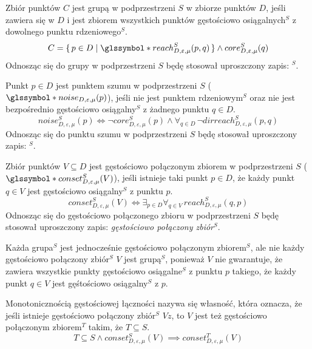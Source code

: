  \newline
Zbiór punktów $ C $ jest grupą w podprzestrzeni $ S $ w zbiorze punktów $ D $, jeśli zawiera się w $ D $ i jest zbiorem wszystkich punktów gęstościowo osiągalnych$^S$ z dowolnego punktu rdzeniowego$^S$. 
\begin{equation}
C = \set{p \in D | \s{reach}^S_{D,\varepsilon,\mu}(p, q)} \land core^S_{D,\varepsilon,\mu}(q)
\end{equation}
Odnosząc się do grupy w podprzestrzeni $ S $ będę stosował uproszczony zapis: \textit{$^S$}.
\smallskip

 \newline
Punkt $ p\in D $ jest punktem szumu w podprzestrzeni $ S $ ($ \s{noise}_{D,\varepsilon,\mu}(p) $), jeśli nie jest punktem rdzeniowym$^S$ oraz nie jest bezpośrednio gęstościowo osiągalny$^S$ z żadnego punktu $q \in D$. 
\begin{equation}
noise^S_{D,\varepsilon,\mu}(p) \iff \neg core^S_{D,\varepsilon,\mu}(p) \land \forall_{q\in D}\,\neg dirreach^S_{D,\varepsilon,\mu}(p, q)
\end{equation}
Odnosząc się do punktu szumu w podprzestrzeni $ S $ będę stosował uproszczony zapis: \textit{$^S$}.
\smallskip

\newline
Zbiór punktów $ V \subseteq D $ jest gęstościowo połączonym zbiorem w podprzestrzeni $ S $ ($ \s{conset}^S_{D,\varepsilon, \mu}(V) $), jeśli istnieje taki punkt $ p \in D $, że każdy punkt $ q \in V $ jest gęstościowo osiągalny$^S$ z punktu $ p $.
\begin{equation}
	conset^S_{D,\varepsilon, \mu}(V) \iff 
	\exists_{p\in D}
	\forall_{q\in V}
	\,reach^S_{D,\varepsilon,\mu}(q, p)
\end{equation}
Odnosząc się do gęstościowo połączonego zbioru w podprzestrzeni $ S $ będę stosował uproszczony zapis: \textit{gęstościowo połączony zbiór$^S$}. 

Każda grupa$ ^S $ jest jednocześnie gęstościowo połączonym zbiorem$^S $, ale nie każdy gęstościowo połączony zbiór$^S $ $ V $ jest grupą$^S $, ponieważ $ V $ nie gwarantuje, że zawiera wszystkie punkty gęstościowo osiągalne$ ^S $ z punktu $ p $ takiego, że każdy punkt $ q\in V $ jest gęśtościowo osiągalny$ ^S $ z $ p $.
\smallskip

\newline
Monotonicznością gęstościowej łączności nazywa się własność, która oznacza, że jeśli istnieje gęstościowo połączony zbiór$^S$ $ V z$, to $ V $ jest też gęstościowo połączonym zbiorem$^T$ takim, że $ T \subseteq S $.
\begin{equation}
	T\subseteq S \land conset^S_{D,\varepsilon,\mu}(V) \implies conset^T_{D,\varepsilon,\mu}(V)
\end{equation}

